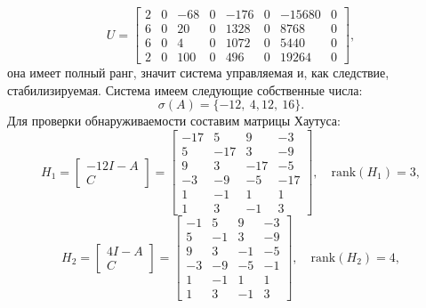 \begin{equation*}
    U=\begin{bmatrix}
        2   & 0   & -68   & 0   & -176   & 0   & -15680   & 0 \\
        6   & 0   & 20    & 0   & 1328   & 0   & 8768     & 0 \\
        6   & 0   & 4     & 0   & 1072   & 0   & 5440     & 0 \\
        2   & 0   & 100   & 0   & 496    & 0   & 19264    & 0
    \end{bmatrix},
\end{equation*}
она имеет полный ранг, значит система управляемая и, как следствие, стабилизируемая.
Система имеем следующие собственные числа:
\begin{equation*}
    \sigma(A)=\{-12,\ 4, 12,\ 16\}.
\end{equation*}
Для проверки обнаруживаемости составим матрицы Хаутуса:
\begin{equation*}
    H_1 = \begin{bmatrix}
        -12 I - A \\ C
    \end{bmatrix} =
    \begin{bmatrix}
        -17 & 5  & 9  & -3 \\
         5  & -17 & 3  & -9 \\
         9  & 3  & -17 & -5 \\
        -3  & -9 & -5  & -17 \\
         1  & -1 & 1   & 1 \\
         1  & 3  & -1  & 3
    \end{bmatrix},\quad
    \text{rank}(H_1) = 3,
\end{equation*}
\begin{equation*}
    H_2 = \begin{bmatrix}
    4 I - A \\ C
    \end{bmatrix} =
    \begin{bmatrix}
        -1 & 5 & 9 & -3 \\
         5 & -1 & 3 & -9 \\
         9 & 3 & -1 & -5 \\
        -3 & -9 & -5 & -1 \\
         1 & -1 & 1 & 1 \\
         1 & 3 & -1 & 3   
        \end{bmatrix},\quad
    \text{rank}(H_2) = 4,
\end{equation*}
